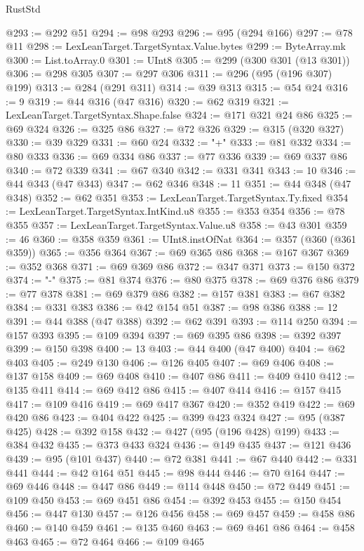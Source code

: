 \begin{lexlean}{RustStd}
\begin{coremodule}
@293 := @292 @51
@294 := @98 @293
@296 := @95 (@294 @166)
@297 := @78 @11
@298 := LexLeanTarget.TargetSyntax.Value.bytes
@299 := ByteArray.mk
@300 := List.toArray.{0}
@301 := UInt8
@305 := @299 (@300 @301 (@13 @301))
@306 := @298 @305
@307 := @297 @306
@311 := @296 (@95 (@196 @307) @199)
@313 := @284 (@291 @311)
@314 := @39 @313
@315 := @54 @24
@316 := 9
@319 := @44 @316 (@47 @316)
@320 := @62 @319
@321 := LexLeanTarget.TargetSyntax.Shape.false
@324 := @171 @321 @24 @86
@325 := @69 @324
@326 := @325 @86
@327 := @72 @326
@329 := @315 (@320 @327)
@330 := @39 @329
@331 := @60 @24
@332 := "+"
@333 := @81 @332
@334 := @80 @333
@336 := @69 @334 @86
@337 := @77 @336
@339 := @69 @337 @86
@340 := @72 @339
@341 := @67 @340
@342 := @331 @341
@343 := 10
@346 := @44 @343 (@47 @343)
@347 := @62 @346
@348 := 11
@351 := @44 @348 (@47 @348)
@352 := @62 @351
@353 := LexLeanTarget.TargetSyntax.Ty.fixed
@354 := LexLeanTarget.TargetSyntax.IntKind.u8
@355 := @353 @354
@356 := @78 @355
@357 := LexLeanTarget.TargetSyntax.Value.u8
@358 := @43 @301
@359 := 46
@360 := @358 @359
@361 := UInt8.instOfNat
@364 := @357 (@360 (@361 @359))
@365 := @356 @364
@367 := @69 @365 @86
@368 := @167 @367
@369 := @352 @368
@371 := @69 @369 @86
@372 := @347 @371
@373 := @150 @372
@374 := "-"
@375 := @81 @374
@376 := @80 @375
@378 := @69 @376 @86
@379 := @77 @378
@381 := @69 @379 @86
@382 := @157 @381
@383 := @67 @382
@384 := @331 @383
@386 := @42 @154 @51
@387 := @98 @386
@388 := 12
@391 := @44 @388 (@47 @388)
@392 := @62 @391
@393 := @114 @250
@394 := @157 @393
@395 := @109 @394
@397 := @69 @395 @86
@398 := @392 @397
@399 := @150 @398
@400 := 13
@403 := @44 @400 (@47 @400)
@404 := @62 @403
@405 := @249 @130
@406 := @126 @405
@407 := @69 @406
@408 := @137 @158
@409 := @69 @408
@410 := @407 @86
@411 := @409 @410
@412 := @135 @411
@414 := @69 @412 @86
@415 := @407 @414
@416 := @157 @415
@417 := @109 @416
@419 := @69 @417 @367
@420 := @352 @419
@422 := @69 @420 @86
@423 := @404 @422
@425 := @399 @423 @324
@427 := @95 (@387 @425)
@428 := @392 @158
@432 := @427 (@95 (@196 @428) @199)
@433 := @384 @432
@435 := @373 @433 @324
@436 := @149 @435
@437 := @121 @436
@439 := @95 (@101 @437)
@440 := @72 @381
@441 := @67 @440
@442 := @331 @441
@444 := @42 @164 @51
@445 := @98 @444
@446 := @70 @164
@447 := @69 @446
@448 := @447 @86
@449 := @114 @448
@450 := @72 @449
@451 := @109 @450
@453 := @69 @451 @86
@454 := @392 @453
@455 := @150 @454
@456 := @447 @130
@457 := @126 @456
@458 := @69 @457
@459 := @458 @86
@460 := @140 @459
@461 := @135 @460
@463 := @69 @461 @86
@464 := @458 @463
@465 := @72 @464
@466 := @109 @465

\end{coremodule}
\end{lexlean}
